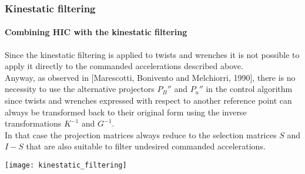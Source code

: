 \begin{frame}[shrink=30]
  \frametitle{Kinestatic filtering}
  \framesubtitle{Combining HIC with the kinestatic filtering}
  Since the kinestatic filtering is applied to twists and wrenches
  it is not possible to apply it directly to the commanded accelerations
  described above.\\
  Anyway, as observed in [Marescotti, Bonivento and Melchiorri, 1990],
  there is no necessity to use the alternative projectors $P_B''$ and
  $P_a''$ in the control algorithm since twists and wrenches expressed
  with respect to another reference point can always be transformed back
  to their original form using the inverse transformations $K^{-1}$ and
  $G^{-1}$.\\
  In that case the projection matrices always reduce to the selection matrices
  $S$ and $I-S$ that are also suitable to filter undesired commanded accelerations.
  \begin{center}
    \texttt{[image: kinestatic\_filtering]}
  \end{center}
\end{frame}
